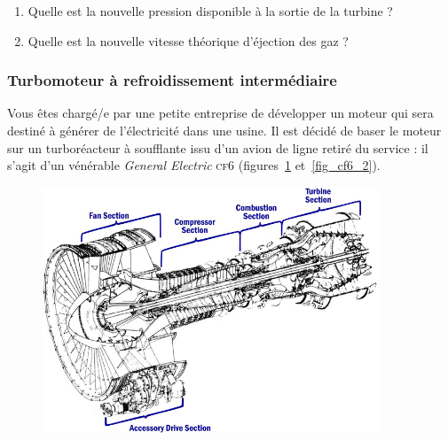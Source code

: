 		\begin{enumerate}
			\item Quelle est la nouvelle pression disponible à la sortie de la turbine ?
			\item Quelle est la nouvelle vitesse théorique d’éjection des gaz ?
		\end{enumerate}


\subsubsection{Turbomoteur à refroidissement intermédiaire}
\label{exo_cf6_generateur_intercooling}

	Vous êtes chargé/e par une petite entreprise de développer un moteur qui sera destiné à générer de l’électricité dans une usine. Il est décidé de baser le moteur sur un turboréacteur à soufflante issu d’un avion de ligne retiré du service : il s’agit d’un vénérable \textit{General Electric} \textsc{cf6} (figures~\ref{fig_cf6_1} et~\ref{fig_cf6_2}).
	
	\begin{figure}
		\begin{center}
		\includegraphics[width=10cm]{images/cf6_cutaway.jpg}
		\end{center}
		\label{fig_cf6_1}
	\end{figure}
	
